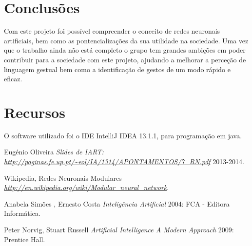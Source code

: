 \documentclass[10pt,a4paper]{article}
\begin{document}
\section{Conclusões}
\subitem

Com este projeto foi possível compreender o conceito de redes neuronais artificiais, bem como as pontencializações da sua utilidade na sociedade. Uma vez que o trabalho ainda não está completo o grupo tem grandes ambições em poder contribuir para a sociedade com este projeto, ajudando a melhorar a perceção de linguagem gestual bem como a identificação de gestos de um modo rápido e eficaz.

\section{Recursos}

O software utilizado foi o IDE IntelliJ IDEA 13.1.1, para programação em java.


 \begin{thebibliography}{1}

   Eugénio Oliveira {\em Slides de IART: {\url{http://paginas.fe.up.pt/~eol/IA/1314/APONTAMENTOS/7_RN.pdf}}}  2013-2014.
  
   Wikipedia, Redes Neuronais Modulares {\em\url{http://en.wikipedia.org/wiki/Modular_neural_network}}.

   Anabela Simões , Ernesto Costa {\em Inteligência Artificial} 2004: FCA - Editora Informática.
  
   Peter Norvig, Stuart Russell {\em Artificial Intelligence A Modern Approach } 2009: Prentice Hall.
  \end{thebibliography}
  \printindex
\end{document}
